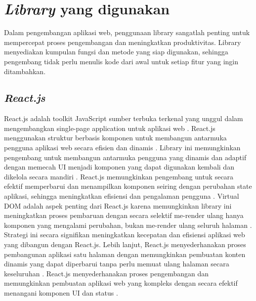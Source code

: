 \section{\textit{Library} yang digunakan}
Dalam pengembangan aplikasi web, penggunaan library sangatlah penting untuk mempercepat proses pengembangan dan meningkatkan produktivitas. Library menyediakan kumpulan fungsi dan metode yang siap digunakan, sehingga pengembang tidak perlu menulis kode dari awal untuk setiap fitur yang ingin ditambahkan.

\subsection{\textit{React.js}}
React.js adalah toolkit JavaScript sumber terbuka terkenal yang unggul dalam mengembangkan single-page application untuk aplikasi web \citep{react2025learn}. React.js menggunakan struktur berbasis komponen untuk membangun antarmuka pengguna aplikasi web secara efisien dan dinamis \citep{oghlukyan2022information}. Library ini memungkinkan pengembang untuk membangun antarmuka pengguna yang dinamis dan adaptif dengan memecah UI menjadi komponen yang dapat digunakan kembali dan dikelola secara mandiri \citep{react2025learn}. React.js memungkinkan pengembang untuk secara efektif memperbarui dan menampilkan komponen seiring dengan perubahan state aplikasi, sehingga meningkatkan efisiensi dan pengalaman pengguna \citep{react2025learn}.
\singlespacing{}
Virtual DOM adalah aspek penting dari React.js karena memungkinkan library ini meningkatkan proses pembaruan dengan secara selektif me-render ulang hanya komponen yang mengalami perubahan, bukan me-render ulang seluruh halaman \citep{oghlukyan2022information}. Strategi ini secara signifikan meningkatkan kecepatan dan efisiensi aplikasi web yang dibangun dengan React.js.
\singlespacing{}
Lebih lanjut, React.js menyederhanakan proses pembangunan aplikasi satu halaman dengan memungkinkan pembuatan konten dinamis yang dapat diperbarui tanpa perlu memuat ulang halaman secara keseluruhan \citep{oghlukyan2022information}. React.js menyederhanakan proses pengembangan dan memungkinkan pembuatan aplikasi web yang kompleks dengan secara efektif menangani komponen UI dan status \citep{react2025learn}.

